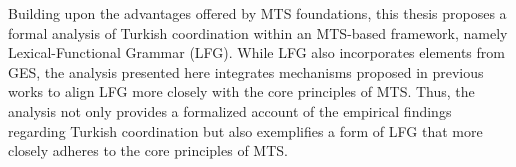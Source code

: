 Building upon the advantages offered by MTS foundations, this thesis proposes a formal analysis of Turkish coordination within an MTS-based framework, namely Lexical-Functional Grammar (LFG). While LFG also incorporates elements from GES, the analysis presented here integrates mechanisms proposed in previous works to align LFG more closely with the core principles of MTS. Thus, the analysis not only provides a formalized account of the empirical findings regarding Turkish coordination but also exemplifies a form of LFG that more closely adheres to the core principles of MTS.
